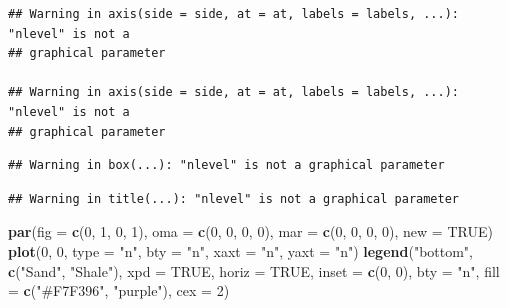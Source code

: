 \documentclass[
]{article}
\newenvironment{Shaded}{\begin{snugshade}}{\end{snugshade}}
\newcommand{\DataTypeTok}[1]{\textcolor[rgb]{0.13,0.29,0.53}{#1}}
\newcommand{\DecValTok}[1]{\textcolor[rgb]{0.00,0.00,0.81}{#1}}
\newcommand{\KeywordTok}[1]{\textcolor[rgb]{0.13,0.29,0.53}{\textbf{#1}}}
\newcommand{\NormalTok}[1]{#1}
\newcommand{\OtherTok}[1]{\textcolor[rgb]{0.56,0.35,0.01}{#1}}
\newcommand{\StringTok}[1]{\textcolor[rgb]{0.31,0.60,0.02}{#1}}
\begin{document}
\begin{verbatim}
## Warning in axis(side = side, at = at, labels = labels, ...): "nlevel" is not a
## graphical parameter

## Warning in axis(side = side, at = at, labels = labels, ...): "nlevel" is not a
## graphical parameter
\end{verbatim}

\begin{verbatim}
## Warning in box(...): "nlevel" is not a graphical parameter
\end{verbatim}

\begin{verbatim}
## Warning in title(...): "nlevel" is not a graphical parameter
\end{verbatim}

\begin{Shaded}
\begin{Highlighting}[]
\KeywordTok{par}\NormalTok{(}\DataTypeTok{fig =} \KeywordTok{c}\NormalTok{(}\DecValTok{0}\NormalTok{, }\DecValTok{1}\NormalTok{, }\DecValTok{0}\NormalTok{, }\DecValTok{1}\NormalTok{), }\DataTypeTok{oma =} \KeywordTok{c}\NormalTok{(}\DecValTok{0}\NormalTok{, }\DecValTok{0}\NormalTok{, }\DecValTok{0}\NormalTok{, }\DecValTok{0}\NormalTok{), }\DataTypeTok{mar =} \KeywordTok{c}\NormalTok{(}\DecValTok{0}\NormalTok{, }\DecValTok{0}\NormalTok{, }\DecValTok{0}\NormalTok{, }\DecValTok{0}\NormalTok{), }\DataTypeTok{new =} \OtherTok{TRUE}\NormalTok{)}
\KeywordTok{plot}\NormalTok{(}\DecValTok{0}\NormalTok{, }\DecValTok{0}\NormalTok{, }\DataTypeTok{type =} \StringTok{"n"}\NormalTok{, }\DataTypeTok{bty =} \StringTok{"n"}\NormalTok{, }\DataTypeTok{xaxt =} \StringTok{"n"}\NormalTok{, }\DataTypeTok{yaxt =} \StringTok{"n"}\NormalTok{)}
\KeywordTok{legend}\NormalTok{(}\StringTok{"bottom"}\NormalTok{, }\KeywordTok{c}\NormalTok{(}\StringTok{"Sand"}\NormalTok{, }\StringTok{"Shale"}\NormalTok{), }\DataTypeTok{xpd =} \OtherTok{TRUE}\NormalTok{, }\DataTypeTok{horiz =} \OtherTok{TRUE}\NormalTok{, }\DataTypeTok{inset =} \KeywordTok{c}\NormalTok{(}\DecValTok{0}\NormalTok{, }
    \DecValTok{0}\NormalTok{), }\DataTypeTok{bty =} \StringTok{"n"}\NormalTok{, }\DataTypeTok{fill =} \KeywordTok{c}\NormalTok{(}\StringTok{"#F7F396"}\NormalTok{, }\StringTok{"purple"}\NormalTok{), }\DataTypeTok{cex =} \DecValTok{2}\NormalTok{)}
\end{Highlighting}
\end{Shaded}
\end{document}
